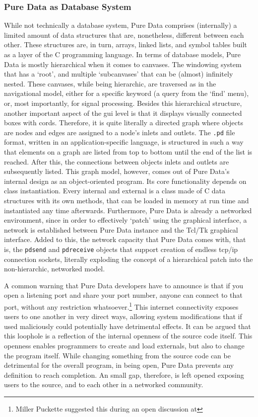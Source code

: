 \subsubsection{Pure Data as Database System}
\label{model:puredata}

While not technically a database system, Pure Data comprises (internally) a limited amount of data structures that are, nonetheless, different between each other. These structures are, in turn, arrays, linked lists, and symbol tables built as a layer of the C programming language. In terms of database models, Pure Data is mostly hierarchical when it comes to canvases. The windowing system that has a `root', and multiple `subcanvases' that can be (almost) infinitely nested. These canvases, while being hierarchic, are traversed as in the navigational model, either for a specific keyword (a query from the `find' menu), or, most importantly, for signal processing. Besides this hierarchical structure, another important aspect of the \gls{gui} level is that it displays visually connected boxes with cords. Therefore, it is quite literally a directed graph where objects are nodes and edges are assigned to a node's inlets and outlets. The \texttt{.pd} file format, written in an application-specific language, is structured in such a way that elements on a graph are listed from top to bottom until the end of the list is reached. After this, the connections between objects inlets and outlets are subsequently listed. This graph model, however, comes out of Pure Data's internal design as an object-oriented program. Its core functionality depends on class instantiation. Every internal and external is a class made of C data structures with its own methods, that can be loaded in memory at run time and instantiated any time afterwards. Furthermore, Pure Data is already a networked environment, since in order to effectively `patch' using the graphical interface, a network is established between Pure Data instance and the Tcl/Tk graphical interface. Added to this, the network capacity that Pure Data comes with, that is, the \texttt{pdsend} and \texttt{pdreceive} objects that support creation of endless \gls{tcp/ip} connection sockets, literally exploding the concept of a hierarchical patch into the non-hierarchic, networked model. 

A common warning that Pure Data developers have to announce is that if you open a listening port and share your port number, anyone can connect to that port, without any restriction whatsoever.\footnote{Miller Puckette suggested this during an open discussion at } This internet connectivity exposes users to one another in very direct ways, allowing system modifications that if used maliciously could potentially have detrimental effects. It can be argued that this loophole is a reflection of the internal openness of the source code itself. This openness enables programmers to create and load externals, but also to change the program itself. While changing something from the source code can be detrimental for the overall program, in being open, Pure Data prevents any definition to reach completion. An small gap, therefore, is left opened exposing users to the source, and to each other in a networked community.


